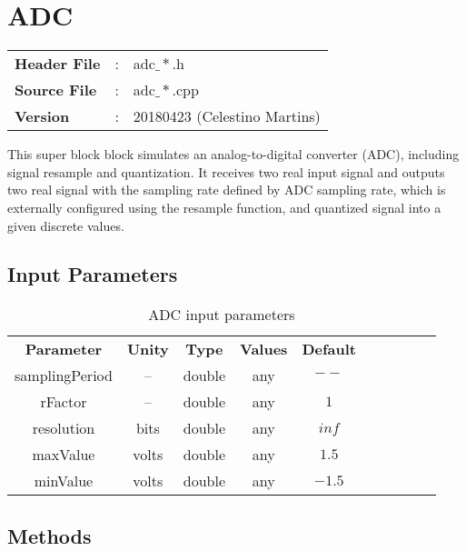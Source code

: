 \clearpage

\section{ADC}

\begin{tcolorbox}	
	\begin{tabular}{p{2.75cm} p{0.2cm} p{10.5cm}} 	
		\textbf{Header File}   &:& adc$\_*$.h \\
		\textbf{Source File}   &:& adc$\_*$.cpp \\
        \textbf{Version}       &:& 20180423 (Celestino Martins) \\
	\end{tabular}
\end{tcolorbox}

This super block block simulates an analog-to-digital converter (ADC), including signal resample and quantization. It receives two real input signal and outputs two real signal with the sampling rate defined by ADC sampling rate, which is externally configured using the resample function, and quantized signal into a given discrete values.

\subsection*{Input Parameters}

\begin{table}[h]
	\centering
	\begin{tabular}{|c|c|c|c|c|c|cccc}
		\cline{1-4}
		\textbf{Parameter} & \textbf{Unity} & \textbf{Type} & \textbf{Values} &   \textbf{Default}& \\ \cline{1-5}
        samplingPeriod & -- & double & any & $--$ \\ \cline{1-5}
        rFactor       & --    & double & any & $1$ \\ \cline{1-5}	
		resolution & bits  & double & any & $inf$ \\ \cline{1-5}	
        maxValue   & volts & double & any & $1.5$ \\ \cline{1-5}	
        minValue   & volts & double & any    & $-1.5$ \\ \cline{1-5}	
	\end{tabular}
	\caption{ADC input parameters}
	\label{table:ADC_in_par}
\end{table}

\subsection*{Methods}

